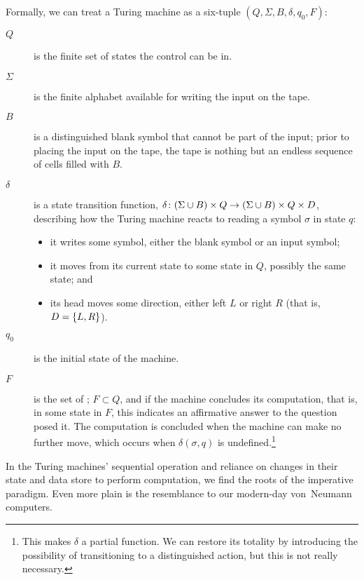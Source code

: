 Formally, we can treat a Turing machine as a six-tuple $(Q, \Sigma, B, \delta, q_{0}, F)$:
\begin{description} %
\item[\MakeUppercase{$Q$}] is the finite set of states the control can be in.
\item[$\Sigma$] is the finite alphabet available for writing the input on the tape.
\item[\MakeUppercase{$B$}] is a distinguished blank symbol that cannot be part of the input; prior to placing the input on the tape, the tape is nothing but an endless sequence of cells filled with $B$.
\item[$\delta$] is a state transition function, $\delta\colon (\Sigma \cup B) \times Q \to (\Sigma \cup B) \times Q \times D$, describing how the Turing machine reacts to reading a symbol $\sigma$ in state $q$:
\begin{itemize}
\item it writes some symbol, either the blank symbol or an input symbol; 
\item it moves from its current state to some state in $Q$, possibly the same state; and
\item its head moves some direction, either left $L$ or right $R$ (that is, $D = \left\{ L, R \right\}$).
\end{itemize}
\item[$q_{0}$] is the initial state of the machine.
\item[\MakeUppercase{$F$}] is the set of ; $F \subset Q$, and if the machine concludes its computation, that is,  in some state in $F$, this indicates an affirmative answer to the question posed it. The computation is concluded when the machine can make no further move, which occurs when $\delta(\sigma, q)$ is undefined.\footnote{This makes $\delta$ a partial function. We can restore its totality by introducing the possibility of transitioning to a distinguished  action, but this is not really necessary.}
\end{description}

In the Turing machines' sequential operation and reliance on changes in their state and data store to perform computation, we find the roots of the imperative paradigm. Even more plain is the resemblance to our modern-day von~Neumann computers. %